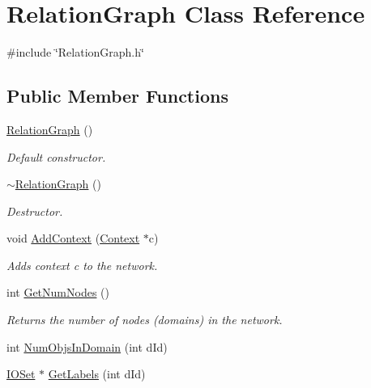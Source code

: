 \hypertarget{class_relation_graph}{
\section{RelationGraph Class Reference}
\label{class_relation_graph}
}


{\ttfamily \#include \char`\"{}RelationGraph.h\char`\"{}}

\subsection*{Public Member Functions}
\begin{DoxyCompactItemize}
\item 
\hypertarget{class_relation_graph_a6bac261190e85c0fa8cce617184ea6a0}{
\hyperlink{class_relation_graph_a6bac261190e85c0fa8cce617184ea6a0}{RelationGraph} ()}
\label{class_relation_graph_a6bac261190e85c0fa8cce617184ea6a0}

\begin{DoxyCompactList}\small\item\em Default constructor. \item\end{DoxyCompactList}\item 
\hypertarget{class_relation_graph_a801766615e87cb42f511cb068dd9d482}{
\hyperlink{class_relation_graph_a801766615e87cb42f511cb068dd9d482}{$\sim$RelationGraph} ()}
\label{class_relation_graph_a801766615e87cb42f511cb068dd9d482}

\begin{DoxyCompactList}\small\item\em Destructor. \item\end{DoxyCompactList}\item 
void \hyperlink{class_relation_graph_a5c1bd71649ec9c19f28b3fe0abda9540}{AddContext} (\hyperlink{class_context}{Context} $\ast$c)
\begin{DoxyCompactList}\small\item\em Adds context c to the network. \item\end{DoxyCompactList}\item 
\hypertarget{class_relation_graph_adeb2d25e6c30b397daec5179473ba122}{
int \hyperlink{class_relation_graph_adeb2d25e6c30b397daec5179473ba122}{GetNumNodes} ()}
\label{class_relation_graph_adeb2d25e6c30b397daec5179473ba122}

\begin{DoxyCompactList}\small\item\em Returns the number of nodes (domains) in the network. \item\end{DoxyCompactList}\item 
int \hyperlink{class_relation_graph_aea7dcd0adc08075a0b2e70854349f77c}{NumObjsInDomain} (int dId)
\item 
\hypertarget{class_relation_graph_a8aa78353932ce1b41e74b48318425482}{
\hyperlink{class_i_o_set}{IOSet} $\ast$ \hyperlink{class_relation_graph_a8aa78353932ce1b41e74b48318425482}{GetLabels} (int dId)}
\label{class_relation_graph_a8aa78353932ce1b41e74b48318425482}


\end{DoxyCompactItemize}
